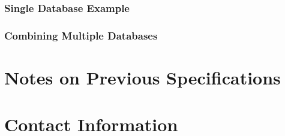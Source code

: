 \documentclass{article}
\begin{document}
\newpage
\subsubsection{Single Database Example}


\subsubsection{Combining Multiple Databases}


\section{Notes on Previous Specifications}


\section{Contact Information}



{}

\end{document}
